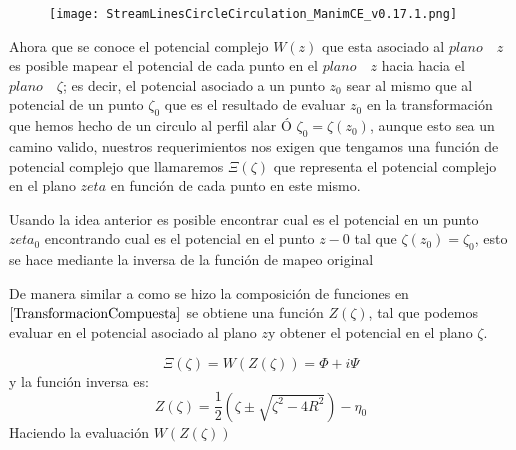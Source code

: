\documentclass[12pt]{article}
\begin{document}
			\begin{figure}[!h]
				\begin{small}
					\begin{center}
						\texttt{[image: StreamLinesCircleCirculation\_ManimCE\_v0.17.1.png]}
					\end{center}
					\caption{}
					\label{fig:}
				\end{small}
			\end{figure}
			

			Ahora que se conoce el potencial complejo $W(z)$ que esta asociado al $plano \quad z$ es posible mapear el potencial de cada punto en el $plano \quad z$ hacia hacia el $plano \quad \zeta$; es decir, el potencial asociado a un punto $z_0$ sear al mismo que al potencial de un punto  $\zeta_0$ que es el resultado de evaluar $z_0$ en la transformación que hemos hecho de un circulo al perfil alar Ó $\zeta_0=\zeta(z_0)$, aunque esto sea un camino valido, nuestros requerimientos nos exigen que tengamos una función de potencial complejo que llamaremos $\Xi(\zeta)$ que representa el potencial complejo en el plano $zeta$ en función de cada punto en este mismo.
			
			Usando la idea anterior es posible encontrar cual es el potencial en un punto $zeta_0$ encontrando cual es el potencial en el punto $z-0$ tal que $\zeta(z_0) = \zeta_0$, esto se hace mediante la inversa de la función de mapeo original
			
			
			De manera similar a como se hizo la composición de funciones en $\ref*{TransformacionCompuesta}$ se obtiene una función $Z(\zeta)$, tal que podemos evaluar en el potencial asociado al plano $z$y obtener el potencial en el plano $\zeta$.

			\begin{equation}
				\Xi(\zeta)= W(Z(\zeta))	= \Phi +i \Psi 			
				\label{eq:}
			\end{equation}
			y la función inversa es:
			\begin{equation}
				Z(\zeta)= \frac{1}{2}\left(\zeta \pm  \sqrt{\zeta^2 -4R^2} \right) - \eta_0
				\label{eq:}
			\end{equation}
			Haciendo la evaluación $W(Z(\zeta))$
			
\end{document}
